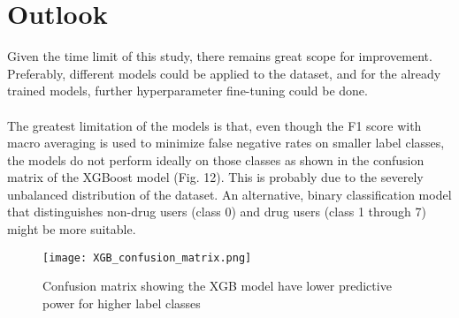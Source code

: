 \documentclass[12pt]{article}
\begin{document}
\section{Outlook}
Given the time limit of this study, there remains great scope for improvement. Preferably, different models could be applied to the dataset, and for the already trained models, further hyperparameter fine-tuning could be done.\\
\\
The greatest limitation of the models is that, even though the F1 score with macro averaging is used to minimize false negative rates on smaller label classes, the models do not perform ideally on those classes as shown in the confusion matrix of the XGBoost model (Fig. 12). This is probably due to the severely unbalanced distribution of the dataset. An alternative, binary classification model that distinguishes non-drug users (class 0) and drug users (class 1 through 7) might be more suitable. 
\begin{figure}[!h]
\centering
\texttt{[image: XGB\_confusion\_matrix.png]}
\caption{Confusion matrix showing the XGB model have lower predictive power for higher label classes}
\end{figure}

\pagebreak
	
	
	
	
\end{document}
